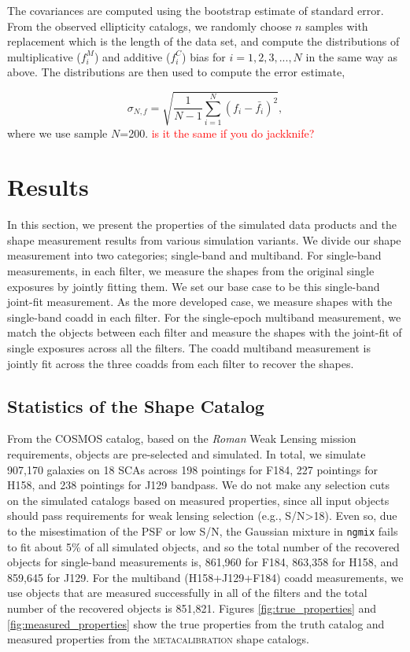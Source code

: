 \documentclass[fleqn,usenatbib]{mnras}
\begin{document}
The covariances are computed using the bootstrap estimate of standard error. From the observed ellipticity catalogs, we randomly choose $n$ samples with replacement which is the length of the data set, and compute the distributions of multiplicative ($f^{M}_{i}$) and additive ($f^{C}_{i}$) bias for $i=1,2,3,...,N$ in the same way as above. The distributions are then used to compute the error estimate,  


\begin{equation}
    \sigma_{N,f} = \sqrt{\frac{1}{N-1} \sum_{i=1}^{N}(f_{i}-\bar{f_{i}})^{2}}, 
\end{equation}
where we use sample $N$=200.  \textcolor{red}{is it the same if you do jackknife?}


\section{Results}
\label{sec:results}
In this section, we present the properties of the simulated data products and the shape measurement results from various simulation variants. We divide our shape measurement into two categories; single-band and multiband. For single-band measurements, in each filter, we measure the shapes from the original single exposures by jointly fitting them. We set our base case to be this single-band joint-fit measurement. As the more developed case, we measure shapes with the single-band coadd in each filter. For the single-epoch multiband measurement, we match the objects between each filter and measure the shapes with the joint-fit of single exposures across all the filters. The coadd multiband measurement is jointly fit across the three coadds from each filter to recover the shapes. 

\subsection{Statistics of the Shape Catalog}
From the COSMOS catalog, based on the \emph{Roman} Weak Lensing mission requirements, objects are pre-selected and simulated. In total, we simulate 907,170 galaxies on 18 SCAs across 198 pointings for F184, 227 pointings for H158, and 238 pointings for J129 bandpass. We do not make any selection cuts on the simulated catalogs based on measured properties, since all input objects should pass requirements for weak lensing selection (e.g., S/N>18). Even so, due to the misestimation of the PSF or low S/N, the Gaussian mixture in \texttt{ngmix} fails to fit about 5\% of all simulated objects, and so the total number of the recovered objects for single-band measurements is, 861,960 for F184, 863,358 for H158, and 859,645 for J129. For the multiband (H158+J129+F184) coadd measurements, we use objects that are measured successfully in all of the filters and the total number of the recovered objects is 851,821.
Figures \ref{fig:true_properties} and \ref{fig:measured_properties} show the true properties from the truth catalog and measured properties from the \textsc{metacalibration} shape catalogs. 
\end{document}
